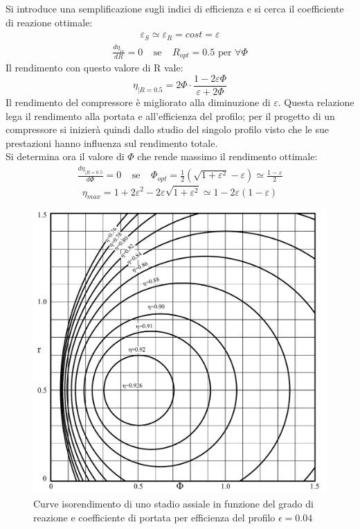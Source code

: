 Si introduce una semplificazione sugli indici di efficienza e si cerca il coefficiente di reazione ottimale:
\begin{align*}
\varepsilon_S \simeq \varepsilon_R = cost = \varepsilon
\end{align*}
\begin{align*}
\frac{d \eta_{is}}{dR} = 0 \;\;\;\; \text{se}  \;\;\;\; R_{opt} = 0.5 \mbox{ per } \forall \Phi
\end{align*}
Il rendimento con questo valore di R vale:
\begin{equation}
\eta_{|R= 0.5} = 2 \Phi \cdot \frac{1- 2 \varepsilon \Phi}{\varepsilon + 2 \Phi}
\end{equation}
Il rendimento del compressore è migliorato alla diminuzione di $\varepsilon$. Questa relazione lega il rendimento alla portata e all'efficienza del profilo; per il progetto di un compressore si inizierà quindi dallo studio del singolo profilo visto che le sue prestazioni hanno influenza sul rendimento totale.\\
Si determina ora il valore di $\Phi$ che rende massimo il rendimento ottimale:
\begin{align*}
\frac{d\eta_{|R=0.5}}{d \Phi} = 0 \;\;\;\; \text{se} \;\;\;\; \Phi_{opt} = \frac{1}{2} \left( \sqrt{1 + \varepsilon^2} - \varepsilon \right) \simeq \frac{1 - \varepsilon}{2}
\end{align*}
\begin{equation}
\eta_{max} = 1 + 2 \varepsilon^2 - 2 \varepsilon \sqrt{1 + \varepsilon^2} \simeq 1 - 2 \varepsilon \left( 1 - \varepsilon \right)
\end{equation}
\begin{figure}
\centering
  \includegraphics[width=\textwidth]{fig/IsoRendCompAss.pdf}
\caption{Curve isorendimento di uno stadio assiale in funzione del grado di reazione e coefficiente di portata per efficienza del profilo $\epsilon=0.04$}
\label{}
\end{figure}

